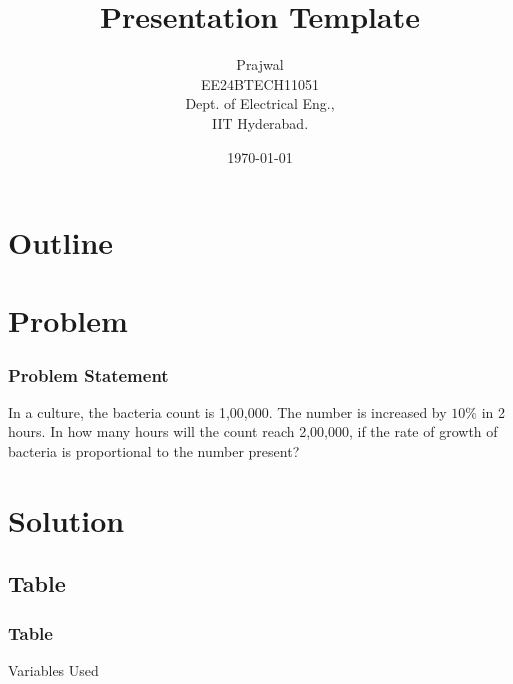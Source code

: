 \documentclass{beamer}
\title{Presentation Template}
\author{Prajwal \\ EE24BTECH11051 \\ Dept. of Electrical Eng.,\\IIT Hyderabad.}
\date{\today}
\theoremstyle{remark}
\numberwithin{equation}{section}
\begin{document}
\begin{frame}
\titlepage
\end{frame}
\section*{Outline}
\begin{frame}
\tableofcontents
\end{frame}
\section{Problem}
\begin{frame}
\frametitle{Problem Statement}
In a culture, the bacteria count is 1,00,000. The number is increased by $10\%$ in 2 hours. In how many hours will the count reach 2,00,000, if the rate of growth of bacteria is proportional to the number present?
\end{frame}
\section{Solution}
\subsection{Table}
\begin{frame}[fragile]
\frametitle{Table}
    \begin{table}[h!]
        \centering
        
        \caption{Variables Used}
        \end{table}
\end{frame}

\end{document}
